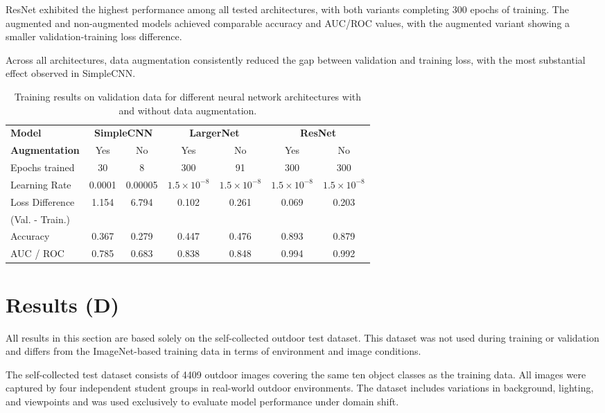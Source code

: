 \documentclass[a4paper]{article}
\begin{document}
ResNet exhibited the highest performance among all tested architectures, with both variants completing 300 epochs of training. The augmented and non-augmented models achieved comparable accuracy and AUC/ROC values, with the augmented variant showing a smaller validation-training loss difference.

Across all architectures, data augmentation consistently reduced the gap between validation and training loss, with the most substantial effect observed in SimpleCNN.


\begin{table}[h]
\centering
\caption{Training results on validation data for different neural network architectures with and without data augmentation.}
\label{tab:training_results}
\begin{tabular}{lcccccc}
\hline
\textbf{Model} & \multicolumn{2}{c}{\textbf{SimpleCNN}} & \multicolumn{2}{c}{\textbf{LargerNet}} & \multicolumn{2}{c}{\textbf{ResNet}} \\
\cline{2-7}
\textbf{Augmentation} & Yes & No & Yes & No & Yes & No \\
\hline
Epochs trained & 30 & 8 & 300 & 91 & 300 & 300 \\
Learning Rate & 0.0001 & 0.00005 & $1.5 \times 10^{-8}$ & $1.5 \times 10^{-8}$ & $1.5 \times 10^{-8}$ & $1.5 \times 10^{-8}$ \\
Loss Difference & 1.154 & 6.794 & 0.102 & 0.261 & 0.069 & 0.203 \\
(Val. - Train.) & & & & & & \\
Accuracy & 0.367 & 0.279 & 0.447 & 0.476 & 0.893 & 0.879 \\
AUC / ROC & 0.785 & 0.683 & 0.838 & 0.848 & 0.994 & 0.992 \\
\hline
\end{tabular}
\end{table}


\section{Results (D)}

All results in this section are based solely on the self-collected outdoor test dataset. This dataset was not used during training or validation and differs from the ImageNet-based training data in terms of environment and image conditions.

The self-collected test dataset consists of 4409 outdoor images covering the same ten object classes as the training data. All images were captured by four independent student groups in real-world outdoor environments. The dataset includes variations in background, lighting, and viewpoints and was used exclusively to evaluate model performance under domain shift.
\end{document}

